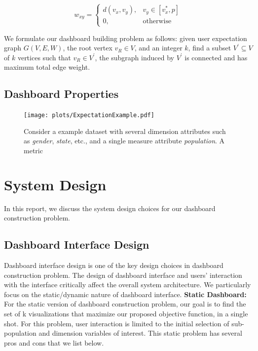 $$
     w_{xy} = 
     \begin{cases} 
      d(v_x,v_y), & v_y\in [v_x^*,p] \\
      0, & \mathrm{otherwise}
    \end{cases}
$$

 We formulate our dashboard building problem as follows: given user expectation graph $G(V, E, W)$, the root vertex $v_R \in V$, and an integer $k$, find a subset $V^\prime \subseteq V$ of $k$ vertices such that $v_R \in V^\prime$, the subgraph induced by $V^\prime$ is connected and has maximum total edge weight.
 \subsection{Dashboard Properties}


 \begin{figure}[ht!]
\centering
\texttt{[image: plots/ExpectationExample.pdf]}
\label{expectation_example}
\caption{Consider a example dataset with several dimension attributes such as \textit{gender}, \textit{state}, etc., and a single measure attribute \textit{population}. A metric}
\end{figure}

\fi

\section{System Design}
In this report, we discuss the system design choices for our dashboard construction problem. 

\subsection{Dashboard Interface Design}
Dashboard interface design is one of the key design choices in dashboard construction problem. The design of dashboard interface and users' interaction with the interface critically affect the overall system architecture. We particularly focus on the static/dynamic nature of dashboard interface.
\newline
\newline
\textbf{Static Dashboard:} For the static version of dashboard construction problem, our goal is to find the set of k visualizations that maximize our proposed objective function, in a single shot. For this problem, user interaction is limited to the initial selection of sub-population and dimension variables of interest. This static problem has several pros and cons that we list below.

